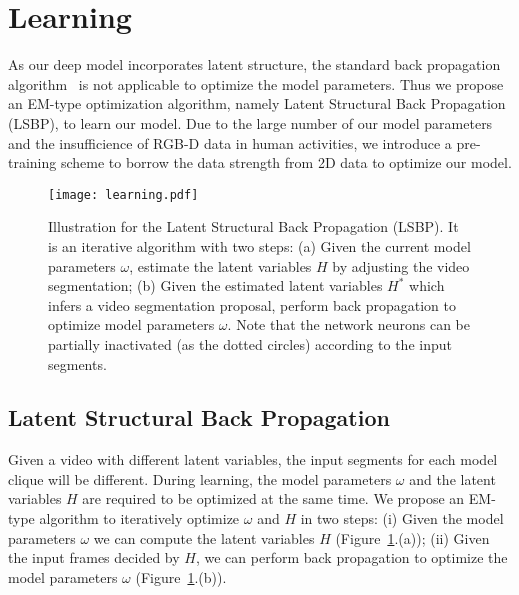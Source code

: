 \documentclass{sig-alternate}
\begin{document}
\section{Learning}

As our deep model incorporates latent structure, the standard back propagation algorithm~\cite{CNN1990} is not applicable to optimize the model parameters. Thus we propose an EM-type optimization algorithm, namely Latent Structural Back Propagation (LSBP), to learn our model. Due to the large number of our model parameters and the insufficience of RGB-D data in human activities, we introduce a pre-training scheme to borrow the data strength from 2D data to optimize our model.

\begin{figure}[!htb]
\centering
\texttt{[image: learning.pdf]}
\caption{ Illustration for the Latent Structural Back Propagation (LSBP). It is an iterative algorithm with two steps: (a) Given the current model parameters $\omega$, estimate the latent variables $H$ by adjusting the video segmentation; (b) Given the estimated latent variables $H^{*}$ which infers a video segmentation proposal, perform back propagation to optimize model parameters $\omega$. Note that the network neurons can be partially inactivated (as the dotted circles) according to the input segments.}\label{fig:learning}
\end{figure}
\subsection{Latent Structural Back Propagation}

Given a video with different latent variables, the input segments for each model clique will be different. During learning, the model parameters $\omega$ and the latent variables $H$ are required to be optimized at the same time. We propose an EM-type algorithm to iteratively optimize $\omega$ and $H$ in two steps: (i) Given the model parameters $\omega$ we can compute the latent variables $H$ (Figure~\ref{fig:learning}.(a)); (ii) Given the input frames decided by $H$, we can perform back propagation to optimize the model parameters $\omega$ (Figure~\ref{fig:learning}.(b)).
\end{document}
